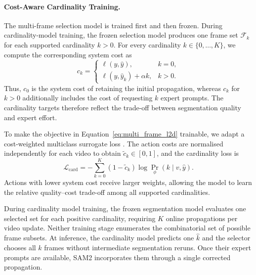 \paragraph{Cost-Aware Cardinality Training.}
The multi-frame selection model is trained first and then frozen. During
cardinality-model training, the frozen selection model produces one frame
set \(\mathcal{F}_k\) for each supported cardinality \(k>0\). For every
cardinality \(k\in\{0,\ldots,K\}\), we compute the corresponding system cost
as
\begin{equation}
c_k=
\begin{cases}
\ell(y,\widehat{y}), & k=0,\\
\ell(y,\widehat{y}_k)+\alpha k, & k>0.
\end{cases}
\end{equation}
Thus, \(c_0\) is the system cost of retaining the initial propagation,
whereas \(c_k\) for \(k>0\) additionally includes the cost of requesting
\(k\) expert prompts. The cardinality targets therefore reflect the
trade-off between segmentation quality and expert effort.

To make the objective in Equation~\eqref{eq:multi_frame_l2d} trainable, we
adapt a cost-weighted multiclass surrogate loss \cite{cortes2024cardinalityawaresetpredictiontopk}. The action costs are
normalised independently for each video to obtain
\(\widetilde{c}_k\in[0,1]\), and the cardinality loss is
\begin{equation}
\mathcal{L}_{\mathrm{card}}
=
-
\sum_{k=0}^{K}
\left(1-\widetilde{c}_k\right)
\log
\Pr_{\phi}(k\mid v,\widehat{y}).
\label{eq:cardinality_loss}
\end{equation}
Actions with lower system cost receive larger weights, allowing the model to
learn the relative quality--cost trade-off among all supported cardinalities.

During cardinality model training, the frozen segmentation model evaluates one
selected set for each positive cardinality, requiring $K$ online
propagations per video update. Neither training stage enumerates the
combinatorial set of possible frame subsets. At inference, the cardinality
model predicts one $\widehat{k}$ and the selector chooses all
$\widehat{k}$ frames without intermediate segmentation reruns. Once their
expert prompts are available, SAM2 incorporates them through a single
corrected propagation.
